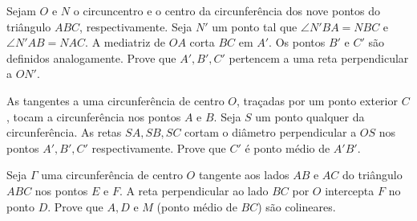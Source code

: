 \begin{questao}
  Sejam $O$ e $N$ o circuncentro e o centro da
  circunferência dos nove pontos do triângulo $ABC$,
  respectivamente. Seja $N'$ um ponto tal que $\angle
  N' BA = NBC $ e  $\angle N' AB = NAC $. A mediatriz
  de $OA$ corta $BC$ em $A'$. Os pontos $B'$ e
  $C'$ são definidos analogamente. Prove que
  $A',B',C'$ pertencem a uma reta perpendicular a
  $ON'$.
\end{questao}

\begin{questao}
  As tangentes a uma circunferência de centro $O$,
  traçadas por um ponto exterior $C$, tocam a circunferência nos
  pontos $A$ e $B$. Seja $S$ um ponto qualquer da
  circunferência. As retas $SA,SB,SC$ cortam o diâmetro
  perpendicular a $OS$ nos pontos $A',B',C'$
  respectivamente. Prove que $C'$ é ponto médio de
  $A' B'$.
\end{questao}

\begin{questao}
  Seja $\Gamma$ uma circunferência de centro $O$
  tangente aos lados $AB$ e $AC$ do triângulo $ABC$ nos pontos
  $E$ e $F$. A reta perpendicular ao lado $BC$ por $O$
  intercepta $F$ no ponto $D$. Prove que $A,D$ e $M$ (ponto
  médio de $BC$) são colineares.
\end{questao}

